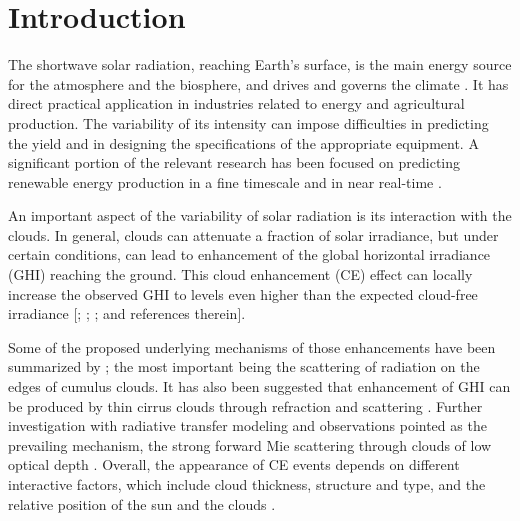 \documentclass[preprint, 5p,
authoryear]{elsarticle} %
\begin{document}
\hypertarget{introduction}{%
\section{Introduction}\label{introduction}}

The shortwave solar radiation, reaching Earth's surface, is the main
energy source for the atmosphere and the biosphere, and drives and
governs the climate \citep{Gray2010}. It has direct practical
application in industries related to energy and agricultural production.
The variability of its intensity can impose difficulties in predicting
the yield and in designing the specifications of the appropriate
equipment. A significant portion of the relevant research has been
focused on predicting renewable energy production in a fine timescale
and in near real-time \citep[for a review
see][]{Inman2013, Graabak2016}.

An important aspect of the variability of solar radiation is its
interaction with the clouds. In general, clouds can attenuate a fraction
of solar irradiance, but under certain conditions, can lead to
enhancement of the global horizontal irradiance (GHI) reaching the
ground. This cloud enhancement (CE) effect can locally increase the
observed GHI to levels even higher than the expected cloud-free
irradiance {[}\citet{Cordero2023}; \citet{Vamvakas2020};
\citet{CastillejoCuberos2020}; and references therein{]}.

Some of the proposed underlying mechanisms of those enhancements have
been summarized by \citet{Gueymard2017}; the most important being the
scattering of radiation on the edges of cumulus clouds. It has also been
suggested that enhancement of GHI can be produced by thin cirrus clouds
through refraction and scattering \citep{Thuillier2013}. Further
investigation with radiative transfer modeling and observations pointed
as the prevailing mechanism, the strong forward Mie scattering through
clouds of low optical depth
\citep{Pecenak2016, Thuillier2013, Yordanov2013, Yordanov2015}. Overall,
the appearance of CE events depends on different interactive factors,
which include cloud thickness, structure and type, and the relative
position of the sun and the clouds \citep{Gueymard2017, Veerman2022}.
\end{document}
